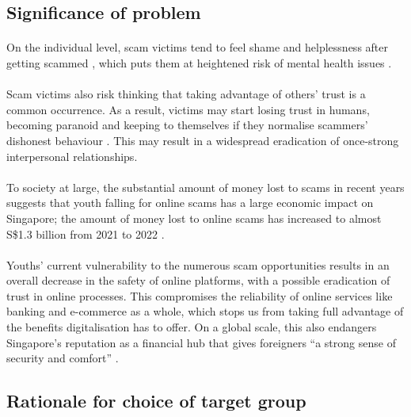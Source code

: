\documentclass[a4paper]{article}
\begin{document}
\subsection{Significance of problem}
\paragraph{} On the individual level, scam victims tend to feel shame and
helplessness after getting scammed \parencite{CNA.2022}, which puts them at
heightened risk of mental health issues \parencite{SiowDivi.2023}.

\paragraph{} Scam victims also risk thinking that taking advantage of others'
trust is a common occurrence. As a result, victims may start losing trust in
humans, becoming paranoid and keeping to themselves if they normalise scammers'
dishonest behaviour \parencite{SiowDivi.2023}. This may result in a widespread
eradication of once-strong interpersonal relationships.

\paragraph{} To society at large, the substantial amount of money lost to scams
in recent years suggests that youth falling for online scams has a large
economic impact on Singapore; the amount of money lost to online scams has
increased to almost S\$1.3 billion from 2021 to 2022 \parencite{Chua.2023}.

\paragraph{} Youths' current vulnerability to the numerous scam opportunities
results in an overall decrease in the safety of online platforms, with a
possible eradication of trust in online processes. This compromises the
reliability of online services like banking and e-commerce as a whole, which
stops us from taking full advantage of the benefits digitalisation has to offer.
On a global scale, this also endangers Singapore’s reputation as a financial hub
that gives foreigners ``a strong sense of security and comfort''
\parencite{Rikvin}.

\subsection{Rationale for choice of target group}
\end{document}
